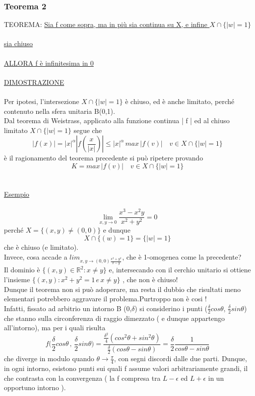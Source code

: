 \documentclass[fontsize = 20px, paper = a4]{article}
\begin{document}
\subsubsection{Teorema 2}
TEOREMA: \underline{Sia f come sopra, ma in più sia continua su X, e infine $X \cap \{|w| = 1\}$} 
\\ \\
\underline{sia chiuso}
\\ \\
\underline{ALLORA f è infinitesima in 0}
\\ \\
\underline{DIMOSTRAZIONE}
\\ \\
Per ipotesi, l'intersezione $X \cap \{|w| = 1 \}$ è chiuso, ed è anche limitato, perché contenuto nella sfera unitaria B(0,1).\\
Dal teorema di Weistrass, applicato alla funzione continua | f | ed al chiuso limitato $X \cap \{ |w| = 1 \}$ segue che 
$$|f(x)| = |x|^\alpha | f \left( \frac{x}{|x|} \right ) | \le |x|^\alpha \, max \, |f(v)|  \quad v\in X \cap \{ |w| = 1 \}$$
è il ragionamento del teorema precedente si può ripetere provando
$$K = max \, |f(v)| \quad v \in X \cap \{|w| = 1 \}$$ 
\\\\
\underline{Esempio}
\\\\
$$\lim_{x,y \to 0} \frac{x^3 - x^2y}{x^2 + y^2} = 0$$
perché $X = \{(x,y) \neq (0,0) \}$ e dunque 
$$X \cap \{(w) = 1 \} = \{|w| = 1\}$$
che è chiuso (e limitato). \\
Invece, cosa accade a $lim_{x,y \to (0,0) \frac{x^2 + y^2}{x-y}}$, che è 1-omogenea come la precedente? \\
Il dominio è $\{ (x,y) \in \mathbb{R}^2 : x \neq y \}$ e, intersecando con il cerchio unitario si ottiene l'insieme $\{ (x,y): x^2 + y^2 = 1 \, e \, x \neq y \}$ , che non è chiuso!\\
Dunque il teorema non si può adoperare, ma resta il dubbio che risultati meno elementari potrebbero aggravare il problema.Purtroppo non è cosi ! \\
Infatti, fissato ad arbitrio un intorno B (0,$\delta$) si considerino i punti ($\frac{\delta}{2} cos\theta$, $\frac{\delta}{2} sin\theta$) che stanno sulla circonferenza di raggio dimezzato ( e dunque appartengo all'intorno), ma per i quali risulta
$$f\Big(\frac{\delta}{2} cos\theta \, , \, \frac{\delta}{2} sin \theta \Big) = \frac{\frac{\delta ^ 2}{4}(cos^2 \theta + sin^2 \theta )}{\frac{\delta}{2} (cos \theta - sin \theta)} = \frac{\delta}{2} \frac{1}{cos \theta - sin \theta}$$
che diverge in modulo quando $\theta \to \frac{\pi}{4}$, con segni discordi dalle due parti. Dunque, in ogni intorno, esistono punti sui quali f assume valori arbitrariamente grandi, il che contrasta con la convergenza ( la f compresa tra 
$L - \epsilon$ ed $L + \epsilon$ in un opportuno intorno ). \\
\end{document}
